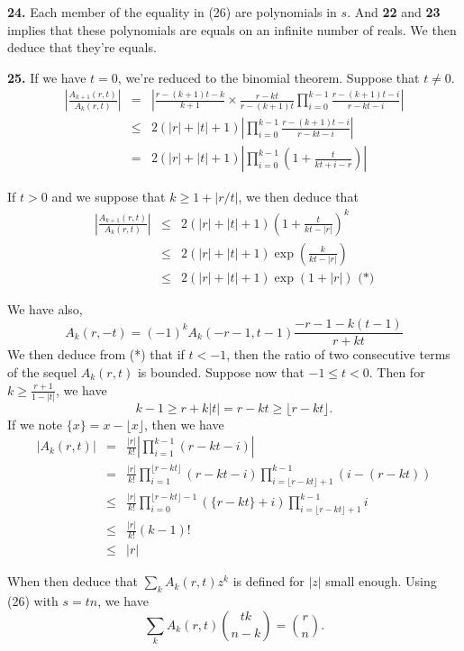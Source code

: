 \documentclass[a4paper,12pt]{article}
\newcommand{\newpar}[1]{\bigskip \noindent \textbf{#1.}}
\begin{document}
\newpar{24} Each member of the equality in (26) are polynomials in
$s$.  And \textbf{22} and \textbf{23} implies that these polynomials
are equals on an infinite number of reals.  We then deduce that
they're equals.

\newpar{25} If we have $t=0$, we're reduced to the binomial theorem.
Suppose that $t \not= 0$.
\begin{eqnarray*}
  \left| \frac{A_{k+1}(r,t)}{A_k(r,t)} \right| &=&
  \left| \frac{r-(k+1)t - k}{k+1}\times \frac{r-kt}{r-(k+1)t} \prod_{i=0}^{k-1}
  \frac{r - (k+1)t - i}{r - kt - i}\right| \\
  &\le& 2(|r|+|t|+1) \left| \prod_{i=0}^{k-1} \frac{r - (k+1)t - i}{r - kt
    - i}\right| \\
  &=& 2(|r|+|t|+1) \left| \prod_{i=0}^{k-1}\left( 1 +
  \frac{t}{kt+i-r}\right)\right|
\end{eqnarray*}

If $t > 0$ and we suppose that $k \ge 1 + |r/t|$, we then deduce that
\begin{eqnarray*}
  \left| \frac{A_{k+1}(r,t)}{A_k(r,t)}\right| &\le& 2(|r|+|t|+1)
  \left(1 + \frac{t}{kt-|r|}\right)^k \\
  &\le& 2(|r|+|t|+1) \exp\left(\frac{k}{kt-|r|}\right) \\
  &\le& 2(|r|+|t|+1) \exp(1 + |r|) \mbox{ (*)}
\end{eqnarray*}

We have also,
\[ A_k(r,-t) = (-1)^k A_k(-r-1,t-1) \frac{-r-1-k(t-1)}{r+kt}\]
We then deduce from (*) that if $t < -1$, then the ratio of two
consecutive terms of the sequel $A_k(r,t)$ is bounded.  Suppose now
that $-1 \le t < 0$. Then for $k \ge \frac{r+1}{1-|t|}$, we have
\[ k-1 \ge r+k|t| = r-kt \ge \lfloor r-kt\rfloor.\]
If we note $\{x\} = x - \lfloor x\rfloor$, then we have
\begin{eqnarray*}
  |A_k(r,t)| &=& \frac{|r|}{k!} \left| \prod_{i=1}^{k-1} (r-kt -i)
  \right| \\
  &=&  \frac{|r|}{k!} \prod_{i=1}^{\lfloor r-kt\rfloor}(r-kt -i)
  \prod_{i=\lfloor r-kt\rfloor + 1}^{k-1}(i-(r-kt)) \\
  &\le& \frac{|r|}{k!} \prod_{i=0}^{\lfloor r-kt\rfloor-1}(\{r-kt\} +
  i) \prod_{i=\lfloor r-kt\rfloor +1}^{k-1} i \\
  &\le& \frac{|r|}{k!} (k-1)! \\
  &\le& |r|
\end{eqnarray*}

When then deduce that $\sum_k A_k(r,t) z^k$ is defined for $|z|$ small
enough.  Using (26) with $s = tn$, we have
\[ \sum_k A_k(r,t) {{tk} \choose {n-k}} = {r \choose n}.\]
\end{document}
